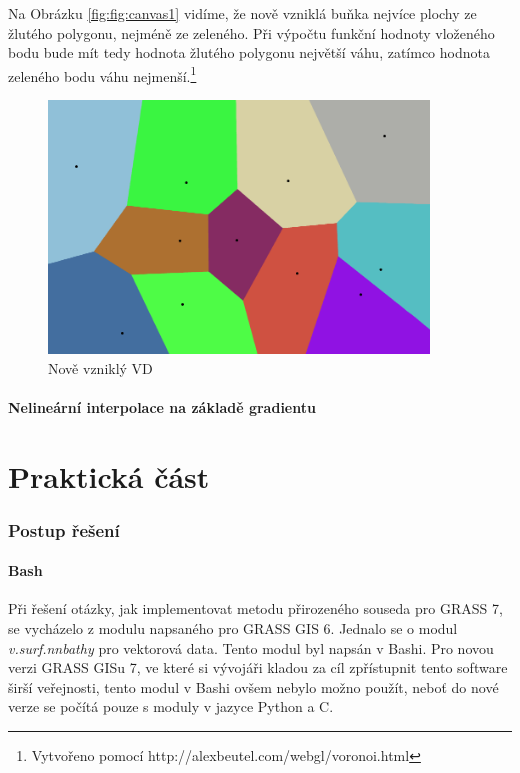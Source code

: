 \documentclass[12pt,a4paper]{article}
\begin{document}
\newpage
Na Obrázku \ref{fig:fig:canvas1} vidíme, že nově vzniklá buňka  nejvíce plochy ze žlutého polygonu, nejméně ze zeleného. Při výpočtu funkční hodnoty vloženého bodu bude mít tedy hodnota žlutého polygonu největší váhu, zatímco hodnota zeleného bodu váhu nejmenší.\footnote{Vytvořeno pomocí http://alexbeutel.com/webgl/voronoi.html}
\begin{figure}[h!]
\centering
\includegraphics[width=0.9\textwidth]{img/canvas_2.png}
\caption{Nově vzniklý VD}
\label{fig:fig:canvas2}
\end{figure}

\subsection{Nelineární interpolace na základě gradientu}

\newpage	
\part{Praktická část}

\newpage
\section{Postup řešení}
\subsection{Bash}
Při řešení otázky, jak implementovat metodu přirozeného souseda pro GRASS 7, se vycházelo z modulu napsaného pro GRASS GIS 6. Jednalo se o modul \emph{v.surf.nnbathy} pro vektorová data. Tento modul byl napsán v Bashi. Pro novou verzi GRASS GISu 7, ve které si vývojáři kladou za cíl zpřístupnit tento software širší veřejnosti, tento modul v Bashi ovšem nebylo možno použít, neboť do nové verze se počítá pouze s moduly v jazyce Python a C.
\end{document}
